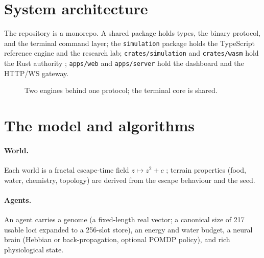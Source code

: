 \documentclass[11pt,a4paper]{article}
\newcommand{\code}[1]{\texttt{\small #1}}
\begin{document}
\section{System architecture}\label{sec:arch}
The repository is a monorepo. A shared package holds types, the binary protocol,
and the terminal command layer; the \code{simulation} package holds the
TypeScript reference engine and the research lab; \code{crates/simulation} and
\code{crates/wasm} hold the Rust authority \citep{matsakis2014}; \code{apps/web} and
\code{apps/server} hold the dashboard and the HTTP/WS gateway.

\begin{figure}[t]\centering
{}
\caption{Two engines behind one protocol; the terminal core is shared.}
\label{fig:arch}
\end{figure}

\section{The model and algorithms}\label{sec:model}
\paragraph{World.} Each world is a fractal escape-time field
$z \mapsto z^2 + c$ \citep{mandelbrot1982}; terrain properties (food, water,
chemistry, topology) are derived from the escape behaviour and the seed.

\paragraph{Agents.} An agent carries a genome (a fixed-length real vector; a
canonical size of 217 usable loci expanded to a 256-slot store), an energy and
water budget, a neural brain (Hebbian or back-propagation, optional POMDP
policy), and rich physiological state.
\end{document}
